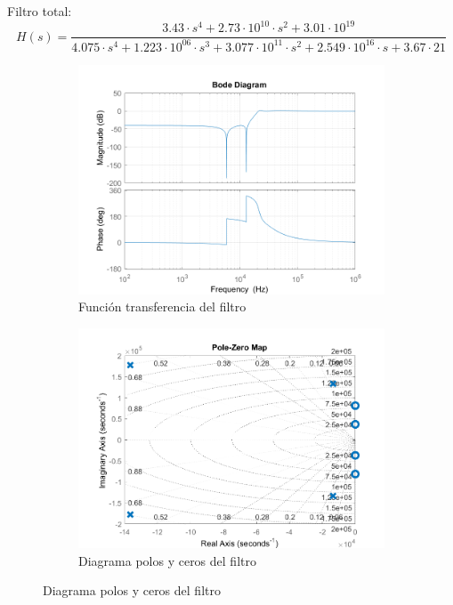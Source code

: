 \documentclass[../../tc_tp5_main.tex]{subfiles}
\begin{document}
Filtro total:
\begin{equation}
H(s) = \frac{3.43\cdot s^4 + 2.73 \cdot 10^{10}\cdot s^2+ 3.01\cdot 10^{19} }{4.075 \cdot s^4 + 1.223\cdot 10^{06}\cdot  s^3 + 3.077\cdot 10^{11}\cdot s^2 + 2.549\cdot 10^{16}\cdot s + 3.67\cdot {21}}
\end{equation}

\begin{figure}[H]	%
	\centering
	\begin{subfigure}[t]{0.7\textwidth}
		\centering
		\includegraphics[width=\textwidth]{imagenes/bode_total_calculo_pablo.png}
		\caption{Funci\'on transferencia del filtro}
		\label{fig:ej3_H_ideal}
	\end{subfigure}%
	\hfill%
	\begin{subfigure}[t]{0.7\textwidth}
		\centering
		\includegraphics[width=\textwidth]{imagenes/pz_total.png}
		\caption{Diagrama polos y ceros del filtro}
		\label{fig:ej3_pz_total}
	\end{subfigure}
\end{figure}
\end{document}
